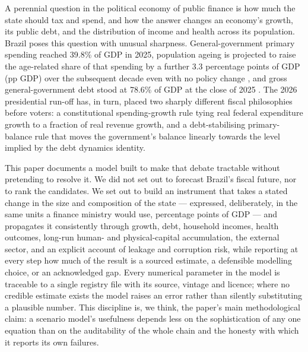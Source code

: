 \documentclass[11pt,a4paper]{article}
\begin{document}
A perennial question in the political economy of public finance is how much the state should tax and spend, and how the answer changes an economy's growth, its public debt, and the distribution of income and health across its population. Brazil poses this question with unusual sharpness. General-government primary spending reached 39.8\% of GDP in 2025, population ageing is projected to raise the age-related share of that spending by a further 3.3 percentage points of GDP (pp GDP) over the subsequent decade even with no policy change \citep{ibge2024,tesouro2025}, and gross general-government debt stood at 78.6\% of GDP at the close of 2025 \citep{bcbsgs}. The 2026 presidential run-off has, in turn, placed two sharply different fiscal philosophies before voters: a constitutional spending-growth rule tying real federal expenditure growth to a fraction of real revenue growth, and a debt-stabilising primary-balance rule that moves the government's balance linearly towards the level implied by the debt dynamics identity.

This paper documents a model built to make that debate tractable without pretending to resolve it. We did not set out to forecast Brazil's fiscal future, nor to rank the candidates. We set out to build an instrument that takes a stated change in the size and composition of the state --- expressed, deliberately, in the same units a finance ministry would use, percentage points of GDP --- and propagates it consistently through growth, debt, household incomes, health outcomes, long-run human- and physical-capital accumulation, the external sector, and an explicit account of leakage and corruption risk, while reporting at every step how much of the result is a sourced estimate, a defensible modelling choice, or an acknowledged gap. Every numerical parameter in the model is traceable to a single registry file with its source, vintage and licence; where no credible estimate exists the model raises an error rather than silently substituting a plausible number. This discipline is, we think, the paper's main methodological claim: a scenario model's usefulness depends less on the sophistication of any one equation than on the auditability of the whole chain and the honesty with which it reports its own failures.
\end{document}
